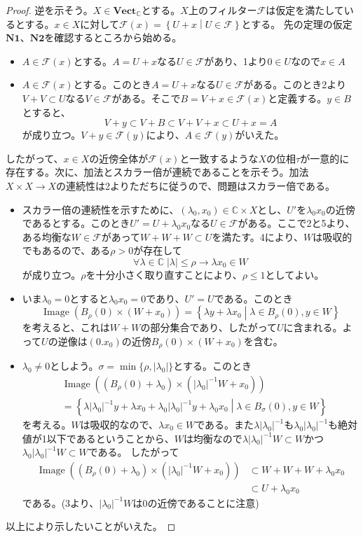 ﻿\documentclass[12pt]{jsarticle}
\newcommand{\C}{\mathbb{C}}
\newcommand{\Vect}{\textbf{Vect}_{\C}}
\newcommand{\F}{\mathcal{F}}%
\newcommand{\setmid}[2]{\left\{ #1 \mathrel{} \middle| \mathrel{} #2 \right\}}%
\newcommand{\abs}[1]{\left \lvert #1 \right \rvert}%
\DeclareMathOperator{\Image}{Image}
\theoremstyle{definition}%
\begin{document}
\begin{proof}
逆を示そう。$X \in \Vect$とする。$X$上のフィルター$\F$は仮定を満たしているとする。$x \in X$に対して$\F(x) = \setmid{U + x}{U \in \F}$とする。
先の定理の仮定$\textbf{N1}$、$\textbf{N2}$を確認するところから始める。
\begin{itemize}
  \item $A \in \F(x)$とする。$A = U + x$なる$U \in \F$があり、1より$0 \in U$なので$x \in A$
  \item $A \in \F(x)$とする。このとき$A = U + x$なる$U \in \F$がある。このとき2より$V + V \subset U$なる$V \in \F$がある。そこで$B = V + x \in \F(x)$と定義する。$y \in B$とすると、
  \[
  V + y \subset V + B \subset V + V + x \subset U + x = A
  \]
  が成り立つ。$V + y \in \F(y)$により、$A \in \F(y)$がいえた。
\end{itemize}
したがって、$x \in X$の近傍全体が$\F(x)$と一致するような$X$の位相$\tau$が一意的に存在する。次に、加法とスカラー倍が連続であることを示そう。加法$X \times X \to X$の連続性は2よりただちに従うので、問題はスカラー倍である。
\begin{itemize}
  \item スカラー倍の連続性を示すために、$(\lambda_0,x_0) \in \C \times X$とし、$U'$を$\lambda_0 x_0$の近傍であるとする。このとき$U' = U + \lambda_0 x_0$なる$U \in \F$がある。ここで2と5より、ある均衡な$W \in \F$があって$W + W + W \subset U$を満たす。4により、$W$は吸収的でもあるので、ある$\rho > 0$が存在して
  \[
  \forall \lambda \in \C \; \abs{\lambda} \leq \rho \to \lambda x_0 \in W
  \]
  が成り立つ。$\rho$を十分小さく取り直すことにより、$\rho \leq 1$としてよい。
 \item いま$\lambda_0 = 0$とすると$\lambda_0 x_0=0$であり、$U'=U$である。このとき
 \[
 \Image (B_{\rho}(0) \times (W + x_0)) = \setmid{\lambda y + \lambda x_0}{\lambda \in B_{\rho}(0), y \in W}
 \]
 を考えると、これは$W + W$の部分集合であり、したがって$U$に含まれる。よって$U$の逆像は$(0.x_0)$の近傍$B_{\rho}(0) \times (W + x_0)$を含む。
 \item $\lambda_0 \neq 0$としよう。$\sigma = \min \{ \rho,\abs{\lambda_0}\}$とする。このとき
 \begin{align*}
 &\Image((B_{\rho}(0)+ \lambda_0) \times (\abs{\lambda_0}^{-1}W + x_0)) \\
 &= \setmid{\lambda \abs{\lambda_0}^{-1} y + \lambda x_0 + \lambda_0 \abs{\lambda_0}^{-1} y + \lambda_0 x_0 }{\lambda \in B_{\sigma}(0), y \in W}
\end{align*}
を考える。$W$は吸収的なので、$\lambda x_0 \in W$である。また$\lambda \abs{\lambda_0}^{-1}$も$\lambda_0 \abs{\lambda_0}^{-1}$も絶対値が1以下であるということから、$W$は均衡なので$\lambda \abs{\lambda_0}^{-1}W \subset W$かつ$\lambda_0 \abs{\lambda_0}^{-1}W \subset W$である。
したがって
\begin{align*}
\Image((B_{\rho}(0)+ \lambda_0) \times (\abs{\lambda_0}^{-1}W + x_0))
&\subset W + W + W + \lambda_0 x_0 \\
&\subset U +  \lambda_0 x_0
\end{align*}
である。(3より、$\abs{\lambda_0}^{-1}W$は0の近傍であることに注意)
\end{itemize}
以上により示したいことがいえた。
\end{proof}
\end{document}
